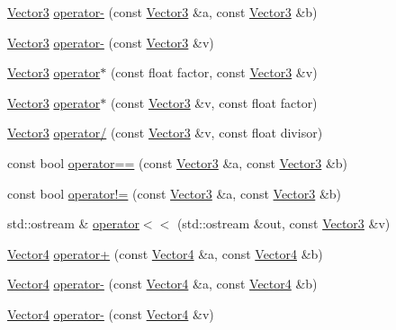 \begin{DoxyCompactItemize}
\item 
\hyperlink{classprism_1_1_vector3}{Vector3} \hyperlink{namespaceprism_a3beb56b334423e027f1ab185785695f8}{operator-\/} (const \hyperlink{classprism_1_1_vector3}{Vector3} \&a, const \hyperlink{classprism_1_1_vector3}{Vector3} \&b)
\item 
\hyperlink{classprism_1_1_vector3}{Vector3} \hyperlink{namespaceprism_a8f7cf835ff415e187e6881169803f502}{operator-\/} (const \hyperlink{classprism_1_1_vector3}{Vector3} \&v)
\item 
\hyperlink{classprism_1_1_vector3}{Vector3} \hyperlink{namespaceprism_a429cccc5eee454ba019045afb4a01e93}{operator$\ast$} (const float factor, const \hyperlink{classprism_1_1_vector3}{Vector3} \&v)
\item 
\hyperlink{classprism_1_1_vector3}{Vector3} \hyperlink{namespaceprism_aa1f2f6de8bf1b584cbb82062a607e167}{operator$\ast$} (const \hyperlink{classprism_1_1_vector3}{Vector3} \&v, const float factor)
\item 
\hyperlink{classprism_1_1_vector3}{Vector3} \hyperlink{namespaceprism_a87e022748076586917c38e83430df284}{operator/} (const \hyperlink{classprism_1_1_vector3}{Vector3} \&v, const float divisor)
\item 
const bool \hyperlink{namespaceprism_a2fc2a483f2e3ec622ad2c0ac9699fbcb}{operator==} (const \hyperlink{classprism_1_1_vector3}{Vector3} \&a, const \hyperlink{classprism_1_1_vector3}{Vector3} \&b)
\item 
const bool \hyperlink{namespaceprism_aa752c5d0210902dece31c2fcfc98a824}{operator!=} (const \hyperlink{classprism_1_1_vector3}{Vector3} \&a, const \hyperlink{classprism_1_1_vector3}{Vector3} \&b)
\item 
std\+::ostream \& \hyperlink{namespaceprism_aa7b9367a483153af865552ba486f1196}{operator$<$$<$} (std\+::ostream \&out, const \hyperlink{classprism_1_1_vector3}{Vector3} \&v)
\item 
\hyperlink{classprism_1_1_vector4}{Vector4} \hyperlink{namespaceprism_a4ac9ebc0ce1449793eb8f521c64929a9}{operator+} (const \hyperlink{classprism_1_1_vector4}{Vector4} \&a, const \hyperlink{classprism_1_1_vector4}{Vector4} \&b)
\item 
\hyperlink{classprism_1_1_vector4}{Vector4} \hyperlink{namespaceprism_a038a64f530d1c50bf72cf1a23886ecca}{operator-\/} (const \hyperlink{classprism_1_1_vector4}{Vector4} \&a, const \hyperlink{classprism_1_1_vector4}{Vector4} \&b)
\item 
\hyperlink{classprism_1_1_vector4}{Vector4} \hyperlink{namespaceprism_a147712ae50c37618cbc61f20efe6729f}{operator-\/} (const \hyperlink{classprism_1_1_vector4}{Vector4} \&v)

\end{DoxyCompactItemize}
